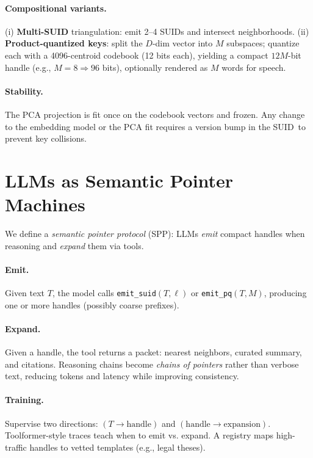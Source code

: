 \documentclass[11pt]{article}
\newcommand{\suid}{\textsc{SUID}}
\begin{document}
\paragraph{Compositional variants.} (i) \textbf{Multi-\suid} triangulation: emit 2--4 \suid s and intersect neighborhoods. (ii) \textbf{Product-quantized keys}: split the $D$-dim vector into $M$ subspaces; quantize each with a 4096-centroid codebook (12 bits each), yielding a compact $12M$-bit handle (e.g., $M{=}8\Rightarrow 96$ bits), optionally rendered as $M$ words for speech.

\paragraph{Stability.} The PCA projection is fit once on the codebook vectors and frozen. Any change to the embedding model or the PCA fit requires a version bump in the \suid\ to prevent key collisions.

\section{LLMs as Semantic Pointer Machines}
\label{sec:llm}
We define a \emph{semantic pointer protocol} (SPP): LLMs \emph{emit} compact handles when reasoning and \emph{expand} them via tools.

\paragraph{Emit.} Given text $T$, the model calls \texttt{emit\_suid$(T,\ell)$} or \texttt{emit\_pq$(T,M)$}, producing one or more handles (possibly coarse prefixes).

\paragraph{Expand.} Given a handle, the tool returns a packet: nearest neighbors, curated summary, and citations. Reasoning chains become \emph{chains of pointers} rather than verbose text, reducing tokens and latency while improving consistency.

\paragraph{Training.} Supervise two directions: $(T\!\to\!\text{handle})$ and $(\text{handle}\!\to\!\text{expansion})$. Toolformer-style traces teach when to emit vs. expand. A registry maps high-traffic handles to vetted templates (e.g., legal theses).
\end{document}
